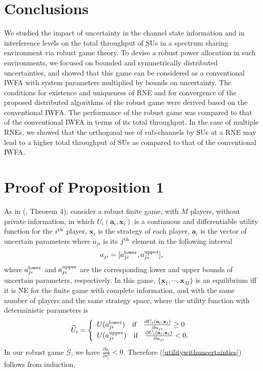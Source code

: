 \documentclass[peerreview,onecolumn,11pt,draftclsnofoot]{IEEEtran}\usepackage{amsmath}\usepackage{amsfonts}\usepackage{epsfig}\usepackage{amssymb}\usepackage{graphicx}\usepackage{amssymb,amsmath}\usepackage{cite}\usepackage{color,soul}\newcommand\T{\rule{0pt}{3.1ex}}
\begin{document}
\section{Conclusions}
We studied the impact of uncertainty in the channel state information and in interference levels on the total throughput of SUs in a spectrum sharing environment via robust game theory. To devise a robust power allocation in such environments, we focused on bounded and symmetrically distributed uncertainties, and showed that this game can be considered as a conventional IWFA with system parameters multiplied by bounds on uncertainty. The conditions for existence and uniqueness of RNE and for convergence of the proposed distributed algorithms of the robust game were derived based on the conventional IWFA. The performance of the robust game was compared to that of the conventional IWFA in terms of its total throughput. In the case of multiple RNEs, we showed that the orthogonal use of sub-channels by SUs at a RNE may lead to a higher total throughput of SUs as compared to that of the conventional IWFA.

\appendices
\section{Proof of Proposition 1}
As in (\!\!\cite{Robustgame}, Theorem 4), consider a robust finite game, with $M$ players, without private information, in which $U_{i}(\textbf{a}_{i}, \textbf{x}_{i})$ is a continuous and differentiable utility function for the $i^{{\scriptsize{\textnormal{th}}}}$ player, $\textbf{x}_{i}$ is the strategy of each player, $\textbf{a}_{i}$ is the vector of
uncertain parameters where $a_{ji}$ is its
$j^{{\scriptsize{\textnormal{th}}}}$ element in the following
interval
\begin{equation}
    a_{ji}=[a_{ji}^{\scriptsize{\textnormal{lower}}},a_{ji}^{\scriptsize{\textnormal{upper}}}], \nonumber
\end{equation}
where $a_{ji}^{\scriptsize{\textnormal{lower}}}$ and
$a_{ji}^{\scriptsize{\textnormal{upper}}}$ are the corresponding lower and upper bounds of uncertain parameters, respectively. In this game, $\{\textbf{x}_{1},\cdots,\textbf{x}_{M}\}$ is an equilibrium iff it is NE for the finite game with complete information, and with the same number of players and the same strategy space, where the utility function with deterministic parameters is
 \[ \widetilde{U}_{i}= \left\{
\begin{array}{l l}
 U(a_{ji}^{\scriptsize{\textnormal{lower}}}) \quad \text{if}  \quad \frac{\partial U_{i}(\textbf{a}_{i}, \textbf{x}_{i})}{\partial a_{ji}}\geq0\\
  U(a_{ji}^{\scriptsize{\textnormal{upper}}}) \quad \text{if} \quad  \frac{\partial U_{i}(\textbf{a}_{i}, \textbf{x}_{i})}{\partial a_{ji}}<0.
\end{array} \right. \]
In our robust game $\widetilde{\mathcal{G}}$, we have
$\frac{\partial \widetilde{u}_{i}}{\partial s^{k}_i}<0$. Therefore (\ref{utilitywithuncertainties}) follows from induction.
\end{document}
